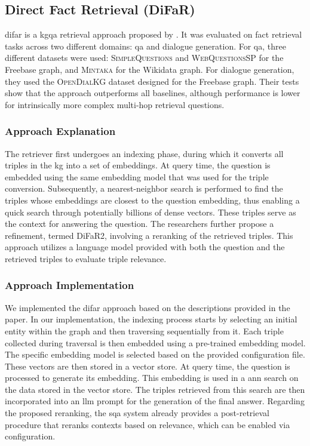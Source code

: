 \subsection{Direct Fact Retrieval (DiFaR)}

\gls{difar} is a \gls{kgqa} retrieval approach proposed by \textcite{baek_direct_2023}. It was evaluated on fact retrieval tasks across two different domains: \gls{qa} and dialogue generation. For \gls{qa}, three different datasets were used: \textsc{SimpleQuestions} and \textsc{WebQuestionsSP} for the Freebase graph, and \textsc{Mintaka} for the Wikidata graph. For dialogue generation, they used the \textsc{OpenDialKG} dataset designed for the Freebase graph. Their tests show that the approach outperforms all baselines, although performance is lower for intrinsically more complex multi-hop retrieval questions.


\subsubsection{Approach Explanation} 
The retriever first undergoes an indexing phase, during which it converts all triples in the \gls{kg} into a set of embeddings. At query time, the question is embedded using the same embedding model that was used for the triple conversion. Subsequently, a nearest-neighbor search is performed to find the triples whose embeddings are closest to the question embedding, thus enabling a quick search through potentially billions of dense vectors. These triples serve as the context for answering the question. The researchers further propose a refinement, termed DiFaR2, involving a reranking of the retrieved triples. This approach utilizes a language model provided with both the question and the retrieved triples to evaluate triple relevance.

\subsubsection{Approach Implementation} 
We implemented the \gls{difar} approach based on the descriptions provided in the paper. In our implementation, the indexing process starts by selecting an initial entity within the graph and then traversing sequentially from it. Each triple collected during traversal is then embedded using a pre-trained embedding model. The specific embedding model is selected based on the provided configuration file. These vectors are then stored in a vector store. At query time, the question is processed to generate its embedding. This embedding is used in a \gls{ann} search on the data stored in the vector store. The triples retrieved from this search are then incorporated into an \gls{llm} prompt for the generation of the final answer. Regarding the proposed reranking, the \gls{sqa} system already provides a post-retrieval procedure that reranks contexts based on relevance, which can be enabled via configuration.




